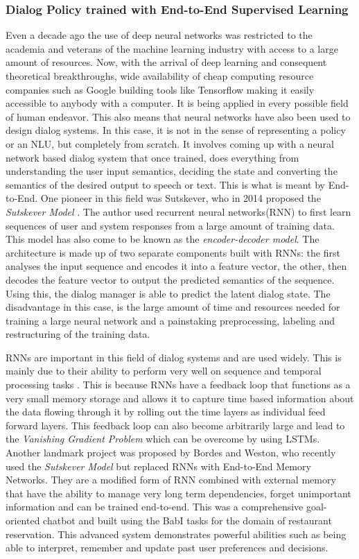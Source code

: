 \documentclass[14pt]{extarticle}
\numberwithin{equation}{section}
\begin{document}
	\subsubsection{Dialog Policy trained with End-to-End Supervised Learning}
	Even a decade ago the use of deep neural networks was restricted to the academia and veterans of the machine learning industry with access to a large amount of resources. Now, with the arrival of deep learning and consequent theoretical breakthroughs, wide availability of cheap computing resource companies such as Google building tools like Tensorflow\cite{tensorflow} making it easily accessible to anybody with a computer. It is being applied in every possible field of human endeavor. This also means that neural networks have also been used to design dialog systems. In this case, it is not in the sense of representing a policy or an NLU, but completely from scratch. It involves coming up with a neural network based dialog system that once trained, does everything from understanding the user input semantics, deciding the state and converting the semantics of the desired output to speech or text. This is what is meant by End-to-End. One pioneer in this field was Sutskever, who in 2014 proposed the \textit{Sutskever Model} \cite{Sutskever_seq_2seq}. The author used recurrent neural networks(RNN) to first learn sequences of user and system responses from a large amount of training data. This model has also come to be known as the \textit{encoder-decoder model}. The architecture is made up of two separate components built with RNNs: the first analyses the input sequence and encodes it into a feature vector, the other, then decodes the feature vector to output the predicted semantics of the sequence. Using this, the dialog manager is able to predict the latent dialog state. The disadvantage in this case, is the large amount of time and resources needed for training a large neural network and a painstaking preprocessing, labeling and restructuring of the training data.
	
	RNNs are important in this field of dialog systems and are used widely. This is mainly due to their ability to perform very well on sequence and temporal processing tasks \cite{karpathy_rnn}. This is because RNNs have a feedback loop that functions as a very small memory storage and allows it to capture time based information about the data flowing through it by rolling out the time layers as individual feed forward layers. This feedback loop can also become arbitrarily large and lead to the \textit{Vanishing Gradient Problem}\cite{hochreiter1998vanishing} which can be overcome by using LSTMs\cite{hochreiter1997long}. Another landmark project was proposed by Bordes and Weston, who recently used the \textit{Sutskever Model} but replaced RNNs with End-to-End Memory Networks\cite{Sukhbaatar_end2end_mem_net}. They are a modified form of RNN combined with external memory that have the ability to manage very long term dependencies, forget unimportant information and can be trained end-to-end. This was a comprehensive goal-oriented chatbot and built using the BabI tasks\cite{babl} for the domain of restaurant reservation\cite{bordes_weston_e2e}. This advanced system demonstrates powerful abilities such as being able to interpret, remember and update past user preferences and decisions.
\end{document}
